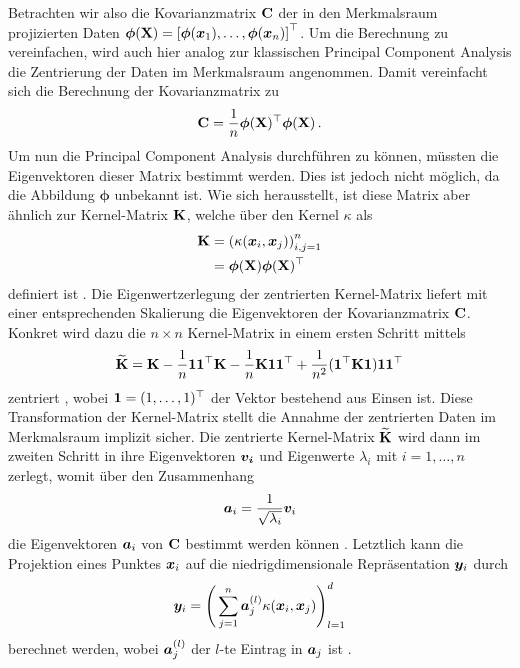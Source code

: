 Betrachten wir also die Kovarianzmatrix $\mathbf{C}$ der in den Merkmalsraum projizierten Daten
$\bm{\phi}(\mathbf{X}) = \left[ \bm{\phi}(\bm{x}_1), \ldots, \bm{\phi}(\bm{x}_n) \right]^\top$. Um
die Berechnung zu vereinfachen, wird auch hier analog zur klassischen Principal Component Analysis
die Zentrierung der Daten im Merkmalsraum angenommen. Damit vereinfacht sich die Berechnung der
Kovarianzmatrix zu
\begin{equation}
	\mathbf{C} = \frac{1}{n} \bm{\phi}(\mathbf{X})^\top \bm{\phi}(\mathbf{X}) \, .
\end{equation}
Um nun die Principal Component Analysis durchführen zu können, müssten die Eigenvektoren dieser Matrix bestimmt werden. Dies ist jedoch nicht möglich, da die Abbildung $\bm{\phi}$ unbekannt ist. Wie sich herausstellt, ist diese Matrix aber ähnlich zur Kernel-Matrix $\mathbf{K}$, welche über den Kernel $\kappa$ als
\begin{align}
	\mathbf{K} & = \left( \kappa(\bm{x}_i, \bm{x}_j) \right)_{i,j = 1}^n \label{eq:kPCA:KernelMatrix_A} \\
	        & = \bm{\phi}(\mathbf{X}) \bm{\phi}(\mathbf{X})^\top \label{eq:kPCA:KernelMatrix_B}
\end{align}
definiert ist \parencite[68]{ShaweTaylor.2011}. Die Eigenwertzerlegung der zentrierten Kernel-Matrix liefert mit
einer entsprechenden Skalierung die Eigenvektoren der Kovarianzmatrix $\mathbf{C}$. Konkret wird dazu
die $n \times n$ Kernel-Matrix in einem ersten Schritt mittels
\begin{equation}
	\label{eq:KernelCentering}
	\widetilde{\mathbf{K}} = \mathbf{K} - \frac{1}{n} \bm{1} \bm{1}^\top \mathbf{K} - \frac{1}{n} \mathbf{K} \bm{1} \bm{1}^\top + \frac{1}{n^2} (\bm{1}^\top \mathbf{K} \bm{1}) \bm{1} \bm{1}^\top
\end{equation}
zentriert \parencite[131]{ShaweTaylor.2011}, wobei $\bm{1} = (1, \ldots, 1)^\top$ der Vektor bestehend aus Einsen
ist. Diese Transformation der Kernel-Matrix stellt die Annahme der zentrierten Daten im
Merkmalsraum implizit sicher. Die zentrierte Kernel-Matrix $\widetilde{\mathbf{K}}$ wird dann im
zweiten Schritt in ihre Eigenvektoren $\bm{v_i}$ und Eigenwerte $\lambda_i$ mit $i = 1, \ldots,
	n$ zerlegt, womit über den Zusammenhang
\begin{equation}
	\label{eq:kPCA:ZusammenhangEigenvektoren}
	\bm{a}_i = \frac{1}{\sqrt{\lambda_i}} \bm{v}_i
\end{equation}
die Eigenvektoren $\bm{a}_i$ von $\mathbf{C}$ bestimmt werden können \parencite[142]{ShaweTaylor.2011}. Letztlich kann die Projektion eines Punktes $\bm{x}_i$ auf die
niedrigdimensionale Repräsentation $\bm{y}_i$ durch
\begin{equation}
	\bm{y}_i = \Bigg( \sum_{j=1}^n \bm{a}_j^{(l)} \kappa(\bm{x}_i, \bm{x}_j) \Bigg)_{l=1}^d
\end{equation}
berechnet werden, wobei $\bm{a}_j^{(l)}$ der $l$-te Eintrag in $\bm{a}_j$ ist \parencite[150]{ShaweTaylor.2011}.

